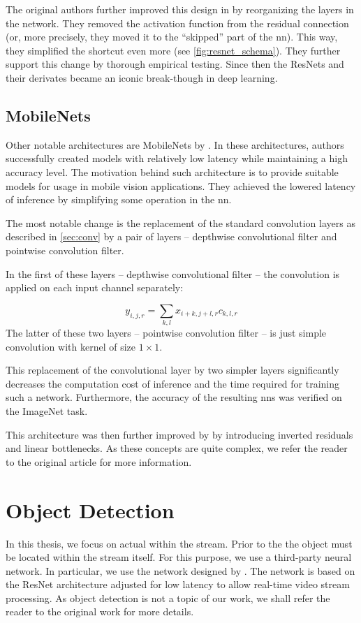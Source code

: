 The original authors further improved this design in \cite{resnetimp} by reorganizing the layers in the network. They removed the activation function from the residual connection (or, more precisely, they moved it to the ``skipped'' part of the \gls{nn}). This way, they simplified the shortcut even more (see \autoref{fig:resnet_schema}). They further support this change by thorough empirical testing. Since then the ResNets and their derivates became an iconic break-though in deep learning.

\subsection{MobileNets}

\label{ssec:mobilenet}

Other notable architectures are MobileNets by \cite{mobilenets}. In these architectures, authors successfully created models with relatively low latency while maintaining a high accuracy level. The motivation behind such architecture is to provide suitable models for usage in mobile vision applications. They achieved the lowered latency of inference by simplifying some operation in the \gls{nn}.

The most notable change is the replacement of the standard convolution layers as described in \autoref{sec:conv} by a pair of layers -- depthwise convolutional filter and pointwise convolution filter.

In the first of these layers -- depthwise convolutional filter -- the convolution is applied on each input channel separately:

$$y_{i, j, r} = \sum_{k, l} x_{i+k, j+l, r} c_{k, l, r}$$
The latter of these two layers -- pointwise convolution filter -- is just simple convolution with kernel of size $1 \times 1$.

This replacement of the convolutional layer by two simpler layers significantly decreases the computation cost of inference and the time required for training such a network. Furthermore, the accuracy of the resulting \glspl{nn} was verified on the ImageNet task.

This architecture was then further improved by \cite{mobilenetv2} by introducing inverted residuals and linear bottlenecks. As these concepts are quite complex, we refer the reader to the original article for more information.


\section{Object Detection}

In this thesis, we focus on actual \reid{} within the stream. Prior to the \reid{} the object must be located within the stream itself. For this purpose, we use a third-party neural network. In particular, we use the network designed by \cite{dobransky2019}. The network is based on the ResNet architecture adjusted for low latency to allow real-time video stream processing. As object detection is not a topic of our work, we shall refer the reader to the original work for more details.